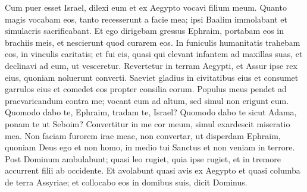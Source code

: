 \begin{biblechapter}
\begin{biblechapter}
\begin{biblechapter}
\begin{biblechapter}
\begin{biblechapter}
\begin{biblechapter}
\begin{biblechapter}
\begin{biblechapter}
\begin{biblechapter}
\begin{biblechapter}
\begin{biblechapter}
 \verse Cum puer esset Israel, dilexi eum
 et ex Aegypto vocavi filium meum.
 \verse Quanto magis vocabam eos,
 tanto recesserunt a facie mea;
 ipsi Baalim immolabant
 et simulacris sacrificabant.
 \verse Et ego dirigebam gressus Ephraim,
 portabam eos in brachiis meis,
 et nescierunt quod curarem eos.
 \verse In funiculis humanitatis trahebam eos,
 in vinculis caritatis;
 et fui eis, quasi qui elevant infantem ad maxillas suas,
 et declinavi ad eum, ut vesceretur.
 \verse Revertetur in terram Aegypti,
 et Assur ipse rex eius,
 quoniam noluerunt converti.
 \verse Saeviet gladius in civitatibus eius
 et consumet garrulos eius
 et comedet eos propter consilia eorum.
 \verse Populus meus pendet ad praevaricandum contra me;
 vocant eum ad altum, sed simul non erigunt eum.
 \verse Quomodo dabo te, Ephraim,
 tradam te, Israel?
 Quomodo dabo te sicut Adama,
 ponam te ut Seboim?
 Convertitur in me cor meum,
 simul exardescit miseratio mea.
 \verse Non faciam furorem irae meae,
 non convertar, ut disperdam Ephraim,
 quoniam Deus ego
 et non homo,
 in medio tui Sanctus
 et non veniam in terrore.
 \verse Post Dominum ambulabunt;
 quasi leo rugiet,
 quia ipse rugiet,
 et in tremore accurrent filii ab occidente.
 \verse Et avolabunt quasi avis ex Aegypto
 et quasi columba de terra Assyriae;
 et collocabo eos in domibus suis,
 dicit Dominus.
 

\end{biblechapter}
\end{biblechapter}
\end{biblechapter}
\end{biblechapter}
\end{biblechapter}
\end{biblechapter}
\end{biblechapter}
\end{biblechapter}
\end{biblechapter}
\end{biblechapter}
\end{biblechapter}
